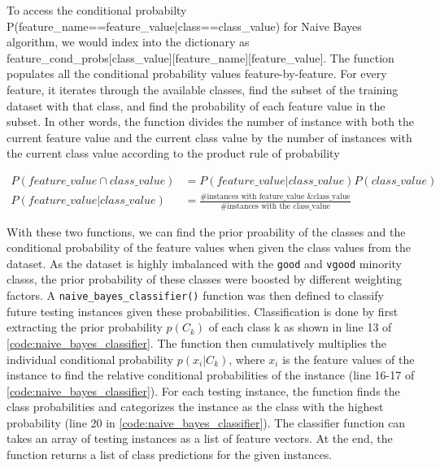 \documentclass[a4paper]{article}
\begin{document}
To access the conditional probabilty P(feature\_name==feature\_value|class==class\_value) for Naive Bayes algorithm, we would index into the dictionary as feature\_cond\_probs[class\_value][feature\_name][feature\_value]. The function populates all the conditional probability values feature-by-feature. For every feature, it iterates through the available classes, find the subset of the training dataset with that class, and find the probability of each feature value in the subset. In other words, the function divides the number of instance with both the current feature value and the current class value by the number of instances with the current class value according to the product rule of probability

\begin{equation}
  \begin{aligned}
    P(feature\_value \cap class\_value) &= P(feature\_value|class\_value)P(class\_value)\\
    P(feature\_value|class\_value) &= \frac{\text{\# instances with feature\_value \& class\_value}}{\text{\# instances with the class\_value}}
  \end{aligned} 
\end{equation}

With these two functions, we can find the prior proability of the classes and the conditional probability of the feature values when given the class values from the dataset. As the dataset is highly imbalanced with the \lstinline{good} and \lstinline{vgood} minority classs, the prior probability of these classes were boosted by different weighting factors. A \lstinline{naive_bayes_classifier()} function was then defined to classify future testing instances given these probabilities. Classification is done by first extracting the prior probability $p(C_k)$ of each class k as shown in line 13 of \autoref{code:naive_bayes_classifier}. The function then cumulatively multiplies the individual conditional probability $p(x_i|C_k)$, where $x_i$ is the feature values of the instance to find the relative conditional probabilities of the instance (line 16-17 of \autoref{code:naive_bayes_classifier}). For each testing instance, the function finds the class probabilities and categorizes the instance as the class with the highest probability (line 20 in \autoref{code:naive_bayes_classifier}). The classifier function can takes an array of testing instances as a list of feature vectors. At the end, the function returns a list of class predictions for the given instances.
\end{document}
